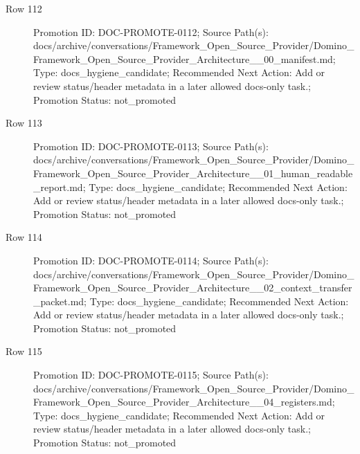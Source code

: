 \documentclass[9pt,a4paper,openany]{book}
\begin{document}
\begin{description}
\item[Row 112] Promotion ID: DOC-\allowbreak{}PROMOTE-\allowbreak{}0112; Source Path(s): docs/\allowbreak{}archive/\allowbreak{}conversations/\allowbreak{}Framework\_\allowbreak{}Open\_\allowbreak{}Source\_\allowbreak{}Provider/\allowbreak{}Domino\_\allowbreak{}Framework\_\allowbreak{}Open\_\allowbreak{}Source\_\allowbreak{}Provider\_\allowbreak{}Architecture\_\allowbreak{}\_\allowbreak{}00\_\allowbreak{}manifest.\allowbreak{}md; Type: docs\_\allowbreak{}hygiene\_\allowbreak{}candidate; Recommended Next Action: Add or review status/\allowbreak{}header metadata in a later allowed docs-\allowbreak{}only task.\allowbreak{}; Promotion Status: not\_\allowbreak{}promoted
\item[Row 113] Promotion ID: DOC-\allowbreak{}PROMOTE-\allowbreak{}0113; Source Path(s): docs/\allowbreak{}archive/\allowbreak{}conversations/\allowbreak{}Framework\_\allowbreak{}Open\_\allowbreak{}Source\_\allowbreak{}Provider/\allowbreak{}Domino\_\allowbreak{}Framework\_\allowbreak{}Open\_\allowbreak{}Source\_\allowbreak{}Provider\_\allowbreak{}Architecture\_\allowbreak{}\_\allowbreak{}01\_\allowbreak{}human\_\allowbreak{}readable\_\allowbreak{}report.\allowbreak{}md; Type: docs\_\allowbreak{}hygiene\_\allowbreak{}candidate; Recommended Next Action: Add or review status/\allowbreak{}header metadata in a later allowed docs-\allowbreak{}only task.\allowbreak{}; Promotion Status: not\_\allowbreak{}promoted
\item[Row 114] Promotion ID: DOC-\allowbreak{}PROMOTE-\allowbreak{}0114; Source Path(s): docs/\allowbreak{}archive/\allowbreak{}conversations/\allowbreak{}Framework\_\allowbreak{}Open\_\allowbreak{}Source\_\allowbreak{}Provider/\allowbreak{}Domino\_\allowbreak{}Framework\_\allowbreak{}Open\_\allowbreak{}Source\_\allowbreak{}Provider\_\allowbreak{}Architecture\_\allowbreak{}\_\allowbreak{}02\_\allowbreak{}context\_\allowbreak{}transfer\_\allowbreak{}packet.\allowbreak{}md; Type: docs\_\allowbreak{}hygiene\_\allowbreak{}candidate; Recommended Next Action: Add or review status/\allowbreak{}header metadata in a later allowed docs-\allowbreak{}only task.\allowbreak{}; Promotion Status: not\_\allowbreak{}promoted
\item[Row 115] Promotion ID: DOC-\allowbreak{}PROMOTE-\allowbreak{}0115; Source Path(s): docs/\allowbreak{}archive/\allowbreak{}conversations/\allowbreak{}Framework\_\allowbreak{}Open\_\allowbreak{}Source\_\allowbreak{}Provider/\allowbreak{}Domino\_\allowbreak{}Framework\_\allowbreak{}Open\_\allowbreak{}Source\_\allowbreak{}Provider\_\allowbreak{}Architecture\_\allowbreak{}\_\allowbreak{}04\_\allowbreak{}registers.\allowbreak{}md; Type: docs\_\allowbreak{}hygiene\_\allowbreak{}candidate; Recommended Next Action: Add or review status/\allowbreak{}header metadata in a later allowed docs-\allowbreak{}only task.\allowbreak{}; Promotion Status: not\_\allowbreak{}promoted

\end{description}
\end{document}
